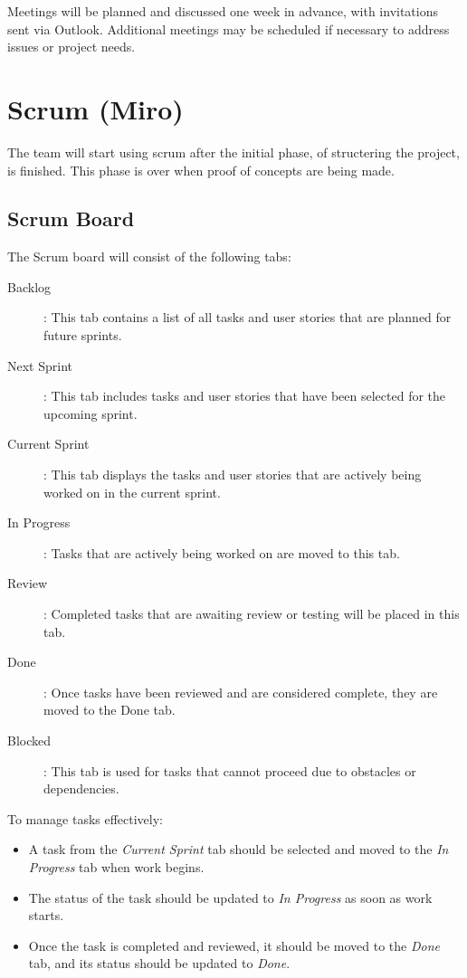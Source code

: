 \documentclass{projdoc}
\begin{document}
Meetings will be planned and discussed one week in advance, with invitations 
sent via Outlook. Additional meetings may be scheduled if necessary to address 
issues or project needs.


\section{Scrum (Miro)}
The team will start using scrum after the initial phase, of structering the project, is finished. This phase is over when proof of concepts are being made.

\subsection{Scrum Board}
The Scrum board \autocite{miro:scrum-board} will consist of the following tabs:
\begin{description}
	\item[Backlog]: This tab contains a list of all tasks and user stories that are planned for future sprints.
	\item[Next Sprint]: This tab includes tasks and user stories that have been selected for the upcoming sprint.
	\item[Current Sprint]: This tab displays the tasks and user stories that are actively being worked on in the current sprint.
	\item[In Progress]: Tasks that are actively being worked on are moved to this tab.
	\item[Review]: Completed tasks that are awaiting review or testing will be placed in this tab.
	\item[Done]: Once tasks have been reviewed and are considered complete, they are moved to the Done tab.
	\item [Blocked]: This tab is used for tasks that cannot proceed due to obstacles or dependencies.
\end{description}

\noindent
To manage tasks effectively:
\begin{itemize}
	\item A task from the \emph{Current Sprint} tab should be selected and moved to the \emph{In Progress} tab when work begins. 
	\item The status of the task should be updated to \emph{In Progress} as soon as work starts.
	\item Once the task is completed and reviewed, it should be moved to the \emph{Done} tab, and its status should be updated to \emph{Done}.
\end{itemize}
\end{document}
